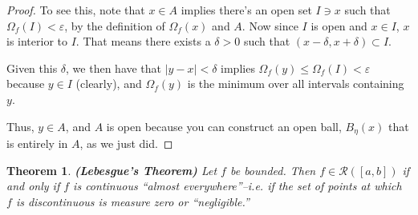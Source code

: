 \documentclass[12pt]{article}
\theoremstyle{plain}
\newtheorem{thm}{Theorem}[subsection]
\theoremstyle{definition}
\theoremstyle{remark}
\begin{document}
\begin{proof}
To see this, note that $x\in A$ implies there's an open set $I\ni x$ such that $\Omega_f(I)<\varepsilon$, by the definition of $\Omega_f(x)$ and $A$.  Now since $I$ is open and $x\in I$, $x$ is interior to $I$. That means there exists a $\delta>0$ such that $(x-\delta, x+\delta)\subset I$. 

Given this $\delta$, we then have that $|y-x|<\delta$ implies $\Omega_f(y) \leq \Omega_f(I) < \varepsilon$ because $y\in I$ (clearly), and $\Omega_f(y)$ is the minimum over all intervals containing $y$. 

Thus, $y \in A$, and $A$ is open because you can construct an open ball, $B_\eta(x)$ that is entirely in $A$, as we just did.

\end{proof}

\begin{thm}
\emph{\textbf{(Lebesgue's Theorem)}}
Let $f$ be bounded. Then $f\in\mathscr{R}([a,b])$ if and only if $f$ is continuous ``almost everywhere''--i.e. if the set of points at which $f$ is discontinuous is measure zero or ``negligible.''
\end{thm}
\end{document}
